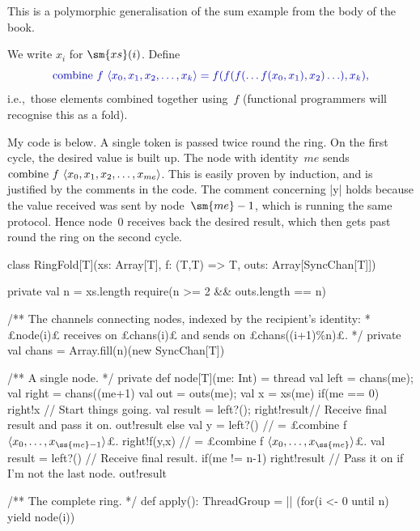 \begin{answerI}
This is a polymorphic generalisation of the sum example from the body of the
book. 

We write $x_i$ for $\sm{xs}(i)$.  Define
\[\mstyle
\mathrm{combine}~f~ \seq{x_0, x_1, x_2, \ldots, x_k} = 
  f(f(f(\ldots f(x_0, x_1), x_2) \ldots ), x_k),
\]
i.e.,~those elements combined together using~$f$ (functional programmers will
recognise this as a fold).  

My code is below.  A single token is passed twice round the ring.  On the
first cycle, the desired value is built up.  The node with identity~$me$ sends
$\mathrm{combine}~f~{\langle x_0, x_1, x_2, \ldots, x_{me}\rangle}$.  This is easily
proven by induction, and is justified by the comments in the code.  The
comment concerning |y| holds because the value received was sent by
node~$\sm{me}-1$, which is running the same protocol.  Hence
node~0 receives back the desired result, which then gets past round the ring
on the second cycle.
%
\begin{scala}
class RingFold[T](xs: Array[T], f: (T,T) => T, outs: Array[SyncChan[T]]){
  private val n = xs.length
  require(n >= 2 && outs.length == n)

  /** The channels connecting nodes, indexed by the recipient's identity:
    * £node(i)£ receives on £chans(i)£ and sends on £chans((i+1)\%n)£. */
  private val chans = Array.fill(n)(new SyncChan[T]) 

  /** A single node. */
  private def node[T](me: Int) = thread{
    val left = chans(me); val right = chans((me+1)%
    val out = outs(me); val x = xs(me)
    if(me == 0){
      right!x // Start things going.
      val result = left?(); right!result// Receive final result and pass it on.
      out!result
    }
    else{
      val y = left?() // = £combine f $\seq{x_0, \ldots, x_{\ss{me}-1}}$£.
      right!f(y,x) // = £combine f $\seq{x_0, \ldots, x_{\ss{me}}}$£.
      val result = left?()          // Receive final result.
      if(me != n-1) right!result    // Pass it on if I'm not the last node.
      out!result
    }
  }  

  /** The complete ring. */
  def apply(): ThreadGroup = || (for(i <- 0 until n) yield node(i))
}
\end{scala}





\end{answerI}
